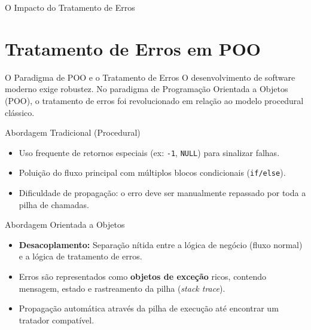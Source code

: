 \documentclass[9pt]{beamer}
\begin{document}
\begin{frame}{O Impacto do Tratamento de Erros}
\begin{center}
    \end{center}
\end{frame}

\section{Tratamento de Erros em POO}

\begin{frame}{O Paradigma de POO e o Tratamento de Erros}
    O desenvolvimento de software moderno exige robustez. No paradigma de Programação Orientada a Objetos (POO), o tratamento de erros foi revolucionado em relação ao modelo procedural clássico.
    
    \vspace{0.3cm}
    
    \begin{block}{Abordagem Tradicional (Procedural)}
        \begin{itemize}
            \item Uso frequente de retornos especiais (ex: \texttt{-1}, \texttt{NULL}) para sinalizar falhas.
            \item Poluição do fluxo principal com múltiplos blocos condicionais (\texttt{if/else}).
            \item Dificuldade de propagação: o erro deve ser manualmente repassado por toda a pilha de chamadas.
        \end{itemize}
    \end{block}
    
    \begin{block}{Abordagem Orientada a Objetos}
        \begin{itemize}
            \item \textbf{Desacoplamento:} Separação nítida entre a lógica de negócio (fluxo normal) e a lógica de tratamento de erros.
            \item Erros são representados como \textbf{objetos de exceção} ricos, contendo mensagem, estado e rastreamento da pilha (\textit{stack trace}).
            \item Propagação automática através da pilha de execução até encontrar um tratador compatível.
        \end{itemize}
    \end{block}
\end{frame}
\end{document}
